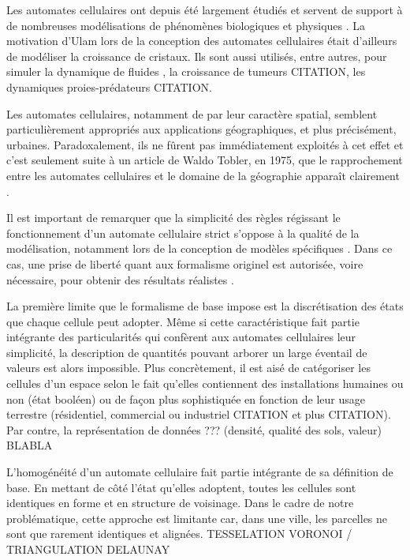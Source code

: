 \documentclass[10pt]{article}
\begin{document}
\begin{multicols}{2}
Les automates cellulaires ont depuis été largement étudiés et servent
de support à de nombreuses modélisations de phénomènes biologiques et
physiques \cite{Ganguly}. La motivation d'Ulam lors de la conception
des automates cellulaires était d'ailleurs de modéliser la croissance
de cristaux. Ils sont aussi utilisés, entre autres, pour simuler la
dynamique de fluides \cite{Frisch1986}, la croissance de tumeurs
CITATION, les dynamiques proies-prédateurs CITATION.

Les automates cellulaires, notamment de par leur caractère spatial,
semblent particulièrement appropriés aux applications géographiques,
et plus précisément, urbaines. Paradoxalement, ils ne fûrent pas
immédiatement exploités à cet effet et c'est seulement suite à un
article de Waldo Tobler, en 1975, que le rapprochement entre les
automates cellulaires et le domaine de la géographie apparaît
clairement \cite{Tobler1975}.

Il est important de remarquer que la simplicité des règles régissant
le fonctionnement d'un automate cellulaire strict s'oppose à la
qualité de la modélisation, notamment lors de la conception de modèles
spécifiques \cite{Torrens2001}. Dans ce cas, une prise de liberté
quant aux formalisme originel est autorisée, voire nécessaire, pour
obtenir des résultats réalistes \cite{White1998}.

La première limite que le formalisme de base impose est la
discrétisation des états que chaque cellule peut adopter. Même si
cette caractéristique fait partie intégrante des particularités qui
confèrent aux automates cellulaires leur simplicité, la description de
quantités pouvant arborer un large éventail de valeurs est alors
impossible. Plus concrètement, il est aisé de catégoriser les cellules
d'un espace selon le fait qu'elles contiennent des installations
humaines ou non (état booléen) ou de façon plus sophistiquée en
fonction de leur usage terrestre (résidentiel, commercial ou
industriel CITATION et plus CITATION). Par contre, la représentation
de données ??? (densité, qualité des sols, valeur) BLABLA

L'homogénéité d'un automate cellulaire fait partie intégrante de sa
définition de base. En mettant de côté l'état qu'elles adoptent,
toutes les cellules sont identiques en forme et en structure de
voisinage. Dans le cadre de notre problématique, cette approche est
limitante car, dans une ville, les parcelles ne sont que rarement
identiques et alignées. TESSELATION VORONOI / TRIANGULATION DELAUNAY


\end{multicols}
\end{document}
